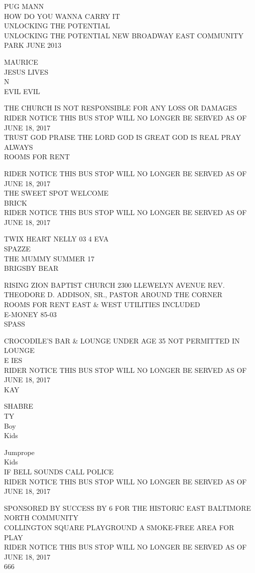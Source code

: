 \documentclass[10pt,letterpaper]{article}
\begin{document}
PUG MANN\\
HOW DO YOU WANNA CARRY IT\\
UNLOCKING THE POTENTIAL\\
UNLOCKING THE POTENTIAL NEW BROADWAY EAST COMMUNITY PARK JUNE 2013

MAURICE\\
JESUS LIVES\\
N\\
EVIL EVIL

THE CHURCH IS NOT RESPONSIBLE FOR ANY LOSS OR DAMAGES\\
RIDER NOTICE THIS BUS STOP WILL NO LONGER BE SERVED AS OF JUNE 18, 2017\\
TRUST GOD PRAISE THE LORD GOD IS GREAT GOD IS REAL PRAY ALWAYS\\
ROOMS FOR RENT

RIDER NOTICE THIS BUS STOP WILL NO LONGER BE SERVED AS OF JUNE 18, 2017\\
THE SWEET SPOT WELCOME\\
BRICK\\
RIDER NOTICE THIS BUS STOP WILL NO LONGER BE SERVED AS OF JUNE 18, 2017

TWIX HEART NELLY 03 4 EVA\\
SPAZZE\\
THE MUMMY SUMMER 17\\
BRIGSBY BEAR

RISING ZION BAPTIST CHURCH 2300 LLEWELYN AVENUE REV. THEODORE D. ADDISON, SR., PASTOR AROUND THE CORNER\\
ROOMS FOR RENT EAST \& WEST UTILITIES INCLUDED\\
E{-}MONEY 85{-}03\\
SPASS

CROCODILE'S BAR \& LOUNGE UNDER AGE 35 NOT PERMITTED IN LOUNGE\\
E IES\\
RIDER NOTICE THIS BUS STOP WILL NO LONGER BE SERVED AS OF JUNE 18, 2017\\
KAY

SHABRE\\
TY\\
Boy\\
Kids

Jumprope\\
Kids\\
IF BELL SOUNDS CALL POLICE\\
RIDER NOTICE THIS BUS STOP WILL NO LONGER BE SERVED AS OF JUNE 18, 2017

SPONSORED BY SUCCESS BY 6 FOR THE HISTORIC EAST BALTIMORE NORTH COMMUNITY\\
COLLINGTON SQUARE PLAYGROUND A SMOKE{-}FREE AREA FOR PLAY\\
RIDER NOTICE THIS BUS STOP WILL NO LONGER BE SERVED AS OF JUNE 18, 2017\\
666
\end{document}
